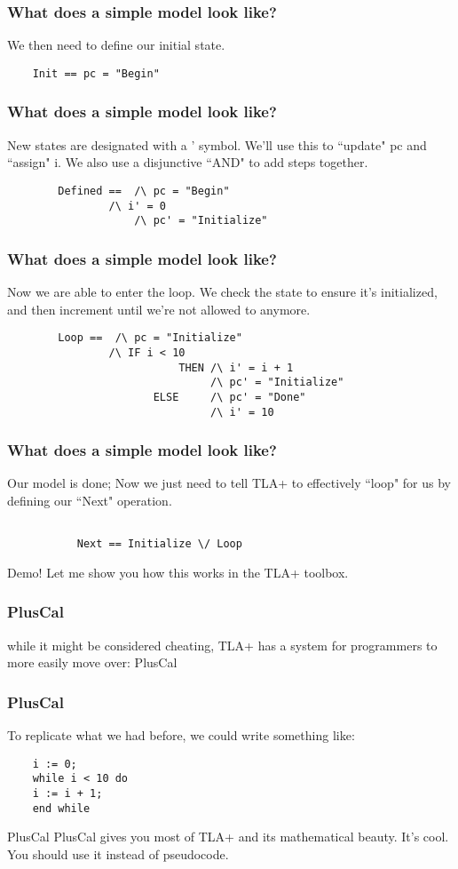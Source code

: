 \documentclass{beamer}
\begin{document}
\begin{frame}[fragile]
	\frametitle{What does a simple model look like?}
	We then need to define our initial state.
	\begin{lstlisting}
	Init == pc = "Begin"
	\end{lstlisting}


\end{frame}

\begin{frame}[fragile]
	\frametitle{What does a simple model look like?}
	New states are designated with a ' symbol.  We'll use this to ``update" pc and ``assign" i. We also use a disjunctive ``AND" to add steps together. 
	\begin{lstlisting}
        Defined ==  /\ pc = "Begin" 
	            /\ i' = 0 
                    /\ pc' = "Initialize"
	\end{lstlisting}


\end{frame}

\begin{frame}[fragile]
	\frametitle{What does a simple model look like?}
	Now we are able to enter the loop.  We check the state to ensure it's initialized, and then increment until we're not allowed to anymore. 
	\begin{lstlisting}
        Loop ==  /\ pc = "Initialize" 
	            /\ IF i < 10  
                           THEN /\ i' = i + 1 
                                /\ pc' = "Initialize"
                       ELSE     /\ pc' = "Done"
                                /\ i' = 10
	\end{lstlisting}


\end{frame}
\begin{frame}[fragile]
	\frametitle{What does a simple model look like?}
Our model is done; Now we just need to tell TLA+ to effectively ``loop" for us by defining our ``Next" operation.
	\begin{lstlisting}

           Next == Initialize \/ Loop
	\end{lstlisting}
\end{frame}
\begin{frame}{Demo!}
    Let me show you how this works in the TLA+ toolbox.
\end{frame}
\begin{frame}[fragile]
	\frametitle{PlusCal}
while it might be considered cheating, TLA+ has a system for programmers to more easily move over: PlusCal
\end{frame}
\begin{frame}[fragile]
	\frametitle{PlusCal}
To replicate what we had before, we could write something like:
	\begin{lstlisting}
	i := 0;
	while i < 10 do
	i := i + 1;
	end while
	\end{lstlisting}

\end{frame}

\begin{frame}{PlusCal}
PlusCal gives you most of TLA+ and its mathematical beauty.  It's cool. You should use it instead of pseudocode.
\end{frame}
\end{document}
